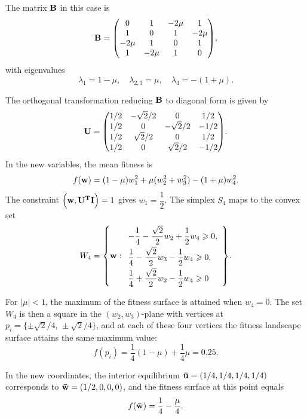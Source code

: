 \documentclass[12pt]{report}
\theoremstyle{definition}
\theoremstyle{remark}
\begin{document}
The matrix ${\bf B}$ in this case is
$$
{\bf B} = 
\begin{pmatrix}
	0 & 1 & -2\mu & 1\\
	1 & 0 & 1 & -2\mu\\
	-2\mu & 1 & 0 & 1\\
	1 & -2\mu & 1 & 0\\
\end{pmatrix}\!,
$$
with eigenvalues
$$
\lambda_{1} = 1 - \mu, \quad \lambda_{2, 3} = \mu, \quad \lambda_{4} = -(1 + \mu).
$$ 

The orthogonal transformation reducing ${\bf B}$ to diagonal form is given by
$$
{\bf U} = 
\begin{pmatrix}
	1/2 & -\sqrt{2}/2 & 0 & 1/2\\
	1/2 & 0 & -\sqrt{2}/2 & -1/2\\
	1/2 & \sqrt{2}/2 & 0 & 1/2\\
	1/2 & 0 & \sqrt{2}/2 & -1/2\\
\end{pmatrix}\!.
$$ 
In the new variables, the mean fitness is
$$
f({\bf w}) = (1 - \mu)w_{1}^{2} + \mu(w_{2}^{2} + w_{3}^{2}) - (1 + \mu)w_{4}^{2}.
$$
The constraint $\Big({\bf w, U^{T}I}\Big) = 1$ gives $w_{1} = \dfrac{1}{2}$. The simplex $S_{4}$ maps to the convex set
\begin{equation*}
    W_{4} = \left\{{\bf w}: 
    \begin{array}{l}
        -\dfrac{1}{4} - \dfrac{\sqrt{2}}{2}w_{2} + \dfrac{1}{2}w_{4} \geqslant 0,\\[6pt]
        \dfrac{1}{4} - \dfrac{\sqrt{2}}{2}w_{3} - \dfrac{1}{2}w_{4} \geqslant 0,\\[6pt]
        \dfrac{1}{4} + \dfrac{\sqrt{2}}{2}w_{2} - \dfrac{1}{2}w_{4} \geqslant 0
    \end{array}
    \right\}\!.
\end{equation*}

For $|\mu| < 1$, the maximum of the fitness surface is attained when $w_{4} = 0$. The set $W_{4}$ is then a square in the $(w_{2}, w_{3})$-plane with vertices at $p_{i} = \{\pm\sqrt{2}/4,\, \pm\sqrt{2}/4\}$, and at each of these four vertices the fitness landscape surface attains the same maximum value:
$$
f(p_{i}) = \frac{1}{4}(1 - \mu) + \frac{1}{4}\mu = 0.25.
$$ 

In the new coordinates, the interior equilibrium ${\bf \bar{u}} = (1/4, 1/4, 1/4, 1/4)$ corresponds to ${\bf \bar{w}} = (1/2, 0, 0, 0)$, and the fitness surface at this point equals
$$
f({\bf \bar{w}}) = \frac{1}{4} - \frac{\mu}{4}.
$$
\end{document}
